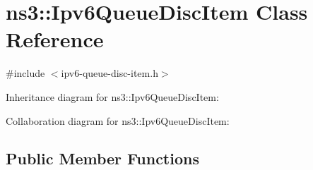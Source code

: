 \hypertarget{classns3_1_1Ipv6QueueDiscItem}{}\section{ns3\+:\+:Ipv6\+Queue\+Disc\+Item Class Reference}
\label{classns3_1_1Ipv6QueueDiscItem}


{\ttfamily \#include $<$ipv6-\/queue-\/disc-\/item.\+h$>$}



Inheritance diagram for ns3\+:\+:Ipv6\+Queue\+Disc\+Item\+:


Collaboration diagram for ns3\+:\+:Ipv6\+Queue\+Disc\+Item\+:
\subsection*{Public Member Functions}

